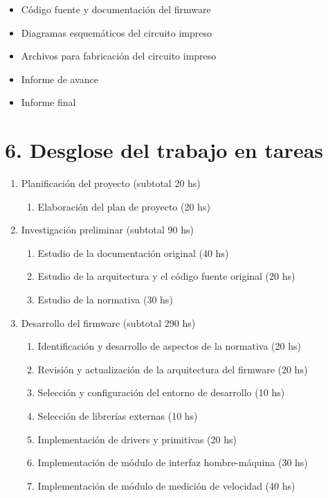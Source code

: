 \documentclass[11pt]{charter}
\begin{document}
\begin{itemize}
\item Código fuente y documentación del firmware
\item Diagramas esquemáticos del circuito impreso
\item Archivos para fabricación del circuito impreso
\item Informe de avance
\item Informe final
\end{itemize}

\newpage

\section{6. Desglose del trabajo en tareas}
\label{sec:wbs}

\begin{enumerate}
\item Planificación del proyecto \hfill (subtotal 20 hs)
  \begin{enumerate}
  \item Elaboración del plan de proyecto \hfill (20 hs)
  \end{enumerate}
\item Investigación preliminar \hfill (subtotal 90 hs)
  \begin{enumerate}
  \item Estudio de la documentación original \hfill (40 hs)
  \item Estudio de la arquitectura y el código fuente original \hfill (20 hs)
  \item Estudio de la normativa \hfill (30 hs)
  \end{enumerate}
\item Desarrollo del firmware \hfill (subtotal 290 hs)
  \begin{enumerate}
  \item Identificación y desarrollo de aspectos de la normativa \hfill (20 hs)
  \item Revisión y actualización de la arquitectura del firmware \hfill (20 hs)
  \item Selección y configuración del entorno de desarrollo \hfill (10 hs)
  \item Selección de librerías externas \hfill (10 hs)
  \item Implementación de drivers y primitivas \hfill (20 hs)
  \item Implementación de módulo de interfaz hombre-máquina \hfill (30 hs)
  \item Implementación de módulo de medición de velocidad \hfill (40 hs)

\end{enumerate}
\end{enumerate}
\end{document}
